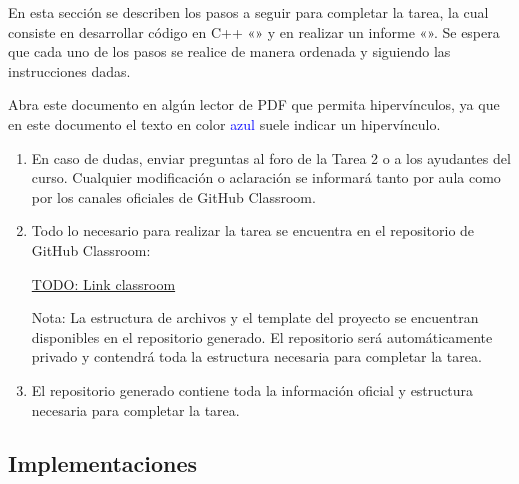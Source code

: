 En esta sección se describen los pasos a seguir para completar la tarea, la cual consiste en desarrollar código
en C++ «» y en realizar un informe «». Se espera que cada
uno de los pasos se realice de manera ordenada y siguiendo las instrucciones dadas.

\begin{mdframed}
    Abra este documento en algún lector de PDF que permita hipervínculos, ya que en este documento el texto en
    color \textcolor{blue}{azul} suele indicar un hipervínculo.
\end{mdframed}

\begin{enumerate}[(1)]
    \item En caso de dudas, enviar preguntas al foro de la Tarea 2 o a los ayudantes del curso. 
    Cualquier modificación o aclaración se informará tanto por aula como por los canales oficiales de GitHub Classroom.

    \item Todo lo necesario para realizar la tarea se encuentra en el repositorio de GitHub Classroom: 
    \begin{center}
        \url{TODO: Link classroom}
    \end{center}
    Nota: La estructura de archivos y el template del proyecto se encuentran disponibles en el repositorio generado. 
    El repositorio será automáticamente privado y contendrá toda la estructura necesaria para completar la tarea.

    \item El repositorio generado contiene toda la información oficial y estructura necesaria para completar la tarea.

\end{enumerate}

\subsection{Implementaciones} \label{subsec:implementations}

